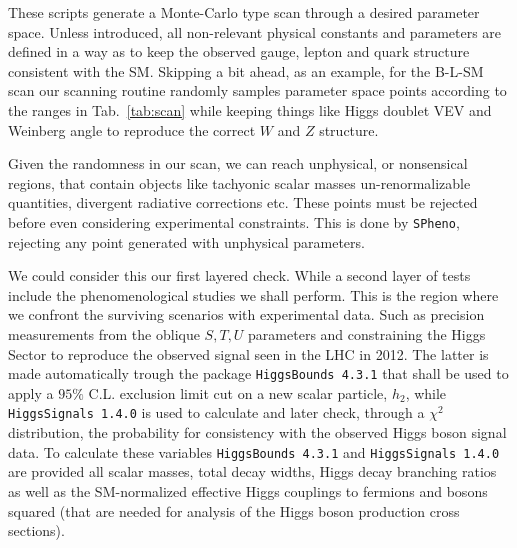 These scripts generate a Monte-Carlo type scan through a desired parameter space. Unless introduced, all non-relevant physical constants and parameters are defined in a way as to keep the observed gauge, lepton and quark structure consistent with the SM. Skipping a bit ahead, as an example, for the B-L-SM scan our scanning routine randomly samples parameter space points according to the ranges in Tab.~\ref{tab:scan} while keeping things like Higgs doublet VEV and Weinberg angle to reproduce the correct 
$W$ and $Z$ structure.

Given the randomness in our scan, we can reach unphysical, or nonsensical regions, that contain objects like tachyonic scalar masses un-renormalizable quantities, divergent radiative corrections etc. These points must be rejected before even considering experimental constraints. This is done by \texttt{SPheno}, rejecting any point generated with unphysical parameters. 

We could consider this our first layered check. While a second layer of tests include the phenomenological studies we shall perform. This is the region where we confront the surviving scenarios with experimental data. Such as precision measurements from the oblique $S,T,U$ parameters and constraining the Higgs Sector to reproduce the observed signal seen in the LHC in 2012. 
%
The latter is made automatically trough the package \texttt{HiggsBounds 4.3.1} that shall be used to apply a $95\%$ C.L. exclusion limit cut on a new scalar particle, $h_2$, while \texttt{HiggsSignals 1.4.0} is used to calculate and later check, through a $\chi^2$ distribution, the probability for consistency with the observed Higgs boson signal data. 
% 
To calculate these variables \texttt{HiggsBounds 4.3.1} and \texttt{HiggsSignals 1.4.0} are provided all scalar masses, total decay widths, Higgs decay branching ratios as well as the SM-normalized effective Higgs couplings to fermions and bosons squared (that are needed for analysis of the Higgs boson production cross sections). %
%
%

